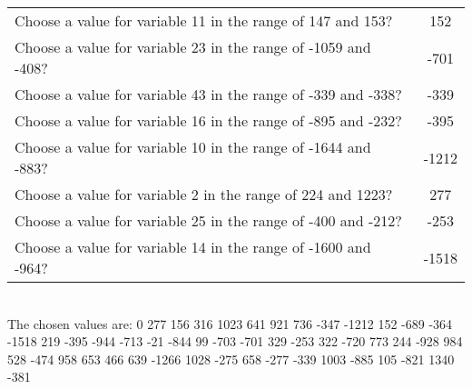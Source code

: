 \documentclass[10pt,a4paper]{article}
\begin{document}
\begin{appendix}
\begin{tabular}{ l  c }
\\Choose a value for variable 11 in the range of 147 and 153? & 152
\\Choose a value for variable 23 in the range of -1059 and -408? & -701
\\Choose a value for variable 43 in the range of -339 and -338? & -339
\\Choose a value for variable 16 in the range of -895 and -232? & -395
\\Choose a value for variable 10 in the range of -1644 and -883? & -1212
\\Choose a value for variable 2 in the range of 224 and 1223? & 277
\\Choose a value for variable 25 in the range of -400 and -212? & -253
\\Choose a value for variable 14 in the range of -1600 and -964? & -1518
\end{tabular}
\\ \phantom{i} The chosen values are: 0   277   156   316  1023   641   921   736  -347 -1212   152  -689  -364 -1518   219  -395  -944  -713   -21  -844    99  -703  -701   329  -253   322  -720   773   244  -928   984   528  -474   958   653   466   639 -1266  1028  -275   658  -277  -339  1003  -885   105  -821  1340  -381
\end{appendix}
\end{document}
